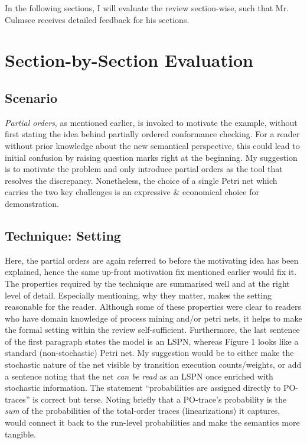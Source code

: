 \documentclass{llncs}
\begin{document}
In the following sections, I will evaluate the review section-wise, such that Mr. Culmsee receives detailed feedback for his sections.

\section{Section-by-Section Evaluation}

\subsection{Scenario}

\emph{Partial orders}, as mentioned earlier, is invoked to motivate the example, without first stating the idea behind partially ordered conformance checking. For a reader without prior knowledge about the new semantical perspective, this could lead to initial confusion by raising question marks right at the beginning. My suggestion is to motivate the problem and only introduce partial orders as the tool that resolves the discrepancy. Nonetheless, the choice of a single Petri net which carries the two key challenges is an expressive \& economical choice for demonstration.

\subsection{Technique: Setting}

Here, the partial orders are again referred to before the motivating idea has been explained, hence the same up-front motivation fix mentioned earlier would fix it. The properties required by the technique are summarised well and at the right level of detail. Especially mentioning, why they matter, makes the setting reasonable for the reader. Although some of these properties were clear to readers who have domain knowledge of process mining and/or petri nets, it helps to make the formal setting within the review self-sufficient.  Furthermore, the last sentence of the first paragraph states the model is an LSPN, whereas Figure 1 looks like a standard (non-stochastic) Petri net. My suggestion would be to either make the stochastic nature of the net visible by transition execution counts/weights, or add a sentence noting that the net \emph{can be read} as an LSPN once enriched with stochastic information. The statement ``probabilities are assigned directly to PO-traces'' is correct but terse. Noting briefly that a PO-trace's probability is the \emph{sum} of the probabilities of the total-order traces (linearizations) it captures, would connect it back to the run-level probabilities and make the semantics more tangible.
\end{document}
